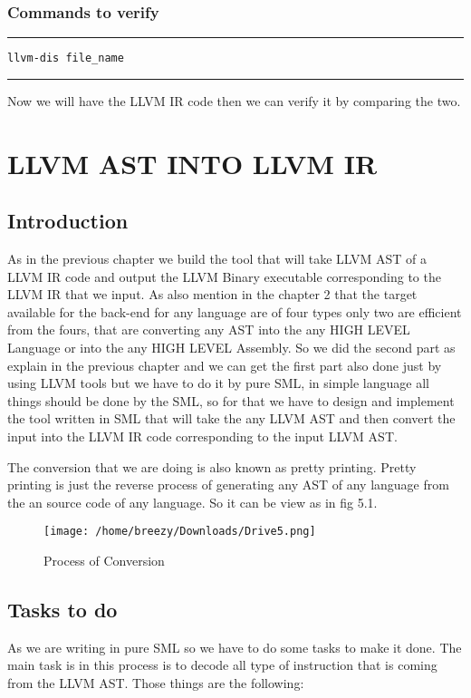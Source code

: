 \documentclass[openany]{book}
\begin{document}
\subsection{Commands to verify}
\noindent\rule{12cm}{0.4pt}

\begin{verbatim}
llvm-dis file_name
\end{verbatim}

\noindent\rule{12cm}{0.4pt}\newline

Now we will have the LLVM IR code then we can verify it by comparing the two.

\chapter{LLVM AST INTO LLVM IR}
\section{Introduction}
As in the previous chapter we build the tool that will take LLVM AST of a LLVM IR code and output the LLVM Binary executable corresponding to the LLVM IR that we input. As also mention in the chapter 2 that the target available for the back-end for any language are of four types only two are efficient from the fours, that are converting any AST into the any HIGH LEVEL Language or into the any HIGH LEVEL Assembly. So we did the second part as explain in the previous chapter and we can get the first part also done just by using LLVM tools but we have to do it by pure SML, in simple language all things should be done by the SML, so for that we have to design and implement the tool written in SML that will take the any LLVM AST and then convert the input into the LLVM IR code corresponding to the input LLVM AST. \newline

The conversion that we are doing is also known as pretty printing. Pretty printing is just the reverse process of generating any AST of any language from the an source code of any language.  So it can be view as in fig 5.1.\newpage

\begin{figure}[h]
	\texttt{[image: /home/breezy/Downloads/Drive5.png]}
	\caption{Process of Conversion}
	\label{fig:5.1}
\end{figure} 

\section{Tasks to do}
As we are writing in pure SML so we have to do some tasks to make it done. The main task is in this process is to decode all type of instruction that is coming from the LLVM AST. Those things are the following:
\end{document}
